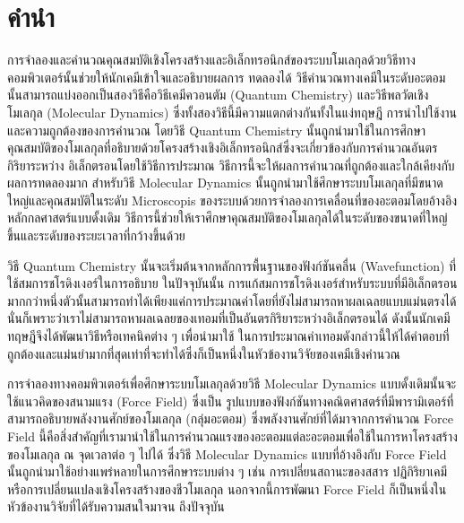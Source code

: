 

{

\chapter*{\centering คำนำ}

การจำลองและคำนวณคุณสมบัติเชิงโครงสร้างและอิเล็กทรอนิกส์ของระบบโมเลกุลด้วยวิธีทางคอมพิวเตอร์นั้นช่วยให้นักเคมีเข้าใจและอธิบายผลการ%
ทดลองได้ วิธีคำนวณทางเคมีในระดับอะตอมนั้นสามารถแบ่งออกเป็นสองวิธีคือวิธีเคมีควอนตัม (Quantum Chemistry) และวิธีพลวัตเชิงโมเลกุล 
(Molecular Dynamics) ซึ่งทั้งสองวิธีนี้มีความแตกต่างกันทั้งในแง่ทฤษฎี การนำไปใช้งานและความถูกต้องของการคำนวณ โดยวิธี Quantum 
Chemistry นั้นถูกนำมาใช้ในการศึกษาคุณสมบัติของโมเลกุลที่อธิบายด้วยโครงสร้างเชิงอิเล็กทรอนิกส์ซึ่งจะเกี่ยวข้องกับการคำนวณอันตรกิริยาระหว่าง%
อิเล็กตรอนโดยใช้วิธีการประมาณ วิธีการนี้จะให้ผลการคำนวณที่ถูกต้องและใกล้เคียงกับผลการทดลองมาก สำหรับวิธี Molecular Dynamics 
นั้นถูกนำมาใช้ศึกษาระบบโมเลกุลที่มีขนาดใหญ่และคุณสมบัติในระดับ Microscopis ของระบบด้วยการจำลองการเคลื่อนที่ของอะตอมโดยอ้างอิง%
หลักกลศาสตร์แบบดั้งเดิม วิธีการนี้ช่วยให้เราศึกษาคุณสมบัติของโมเลกุลได้ในระดับของขนาดที่ใหญ่ขึ้นและระดับของระยะเวลาที่กว้างขึ้นด้วย

วิธี Quantum Chemistry นั้นจะเริ่มต้นจากหลักการพื้นฐานของฟังก์ชันคลื่น (Wavefunction) ที่ใช้สมการชโรดิงเงอร์ในการอธิบาย ในปัจจุบันนั้น%
การแก้สมการชโรดิงเงอร์สำหรับระบบที่มีอิเล็กตรอนมากกว่าหนึ่งตัวนั้นสามารถทำได้เพียงแค่การประมาณค่าโดยที่ยังไม่สามารถหาผลเฉลยแบบแม่นตรงได้%
นั่นก็เพราะว่าเราไม่สามารถหาผลเฉลยของเทอมที่เป็นอันตรกิริยาระหว่างอิเล็กตรอนได้ ดังนั้นนักเคมีทฤษฎีจึงได้พัฒนาวิธีหรือเทคนิคต่าง ๆ เพื่อนำมาใช้%
ในการประมาณค่าเทอมดังกล่าวนี้ให้ได้คำตอบที่ถูกต้องและแม่นยำมากที่สุดเท่าที่จะทำได้ซึ่งก็เป็นหนึ่งในหัวข้องานวิจัยของเคมีเชิงคำนวณ

การจำลองทางคอมพิวเตอร์เพื่อศึกษาระบบโมเลกุลด้วยวิธี Molecular Dynamics แบบดั้งเดิมนั้นจะใช้แนวคิดของสนามแรง (Force Field) ซึ่งเป็น%
รูปแบบของฟังก์ชันทางคณิตศาสตร์ที่มีพารามิเตอร์ที่สามารถอธิบายพลังงานศักย์ของโมเลกุล (กลุ่มอะตอม) ซึ่งพลังงานศักย์ที่ได้มาจากการคำนวณ Force 
Field นี้คือสิ่งสำคัญที่เรามานำใช้ในการคำนวณแรงของอะตอมแต่ละอะตอมเพื่อใช้ในการหาโครงสร้างของโมเลกุล ณ จุดเวลาต่อ ๆ ไปได้ ซึ่งวิธี 
Molecular Dynamics แบบที่อ้างอิงกับ Force Field นั้นถูกนำมาใช้อย่างแพร่หลายในการศึกษาระบบต่าง ๆ เช่น การเปลี่ยนสถานะของสสาร 
ปฏิกิริยาเคมีหรือการเปลี่ยนแปลงเชิงโครงสร้างของชีวโมเลกุล นอกจากนี้การพัฒนา Force Field ก็เป็นหนึ่งในหัวข้องานวิจัยที่ได้รับความสนใจมาจน%
ถึงปัจจุบัน

}
